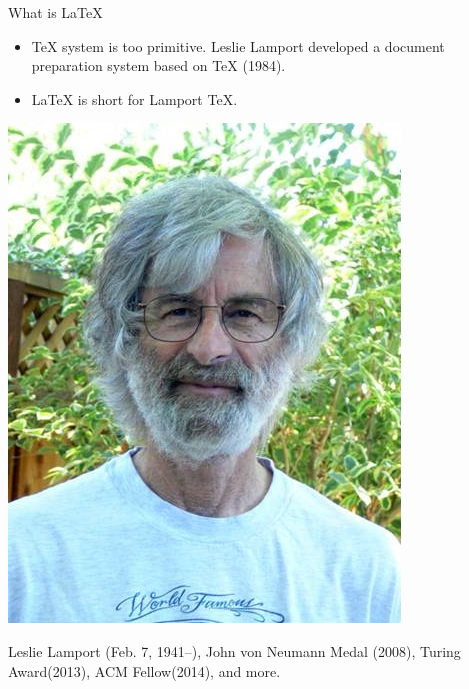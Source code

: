 \documentclass[10pt,t]{beamer}
\begin{document}
\begin{frame}{What is \LaTeX}
\begin{itemize}
    \item \TeX{} system is too primitive. Leslie Lamport developed a document
    preparation system based on \TeX{} (1984).

\item \LaTeX{} is short for \alert{La}mport \alert{TeX{}}.
\end{itemize}
\begin{center}
    \includegraphics[height=.5\textheight]{Leslie-Lamport.jpg}
\end{center}
    Leslie Lamport (Feb. 7, 1941--),
    John von Neumann Medal (2008),
    Turing Award(2013), ACM Fellow(2014), and more.
\end{frame}
\end{document}
